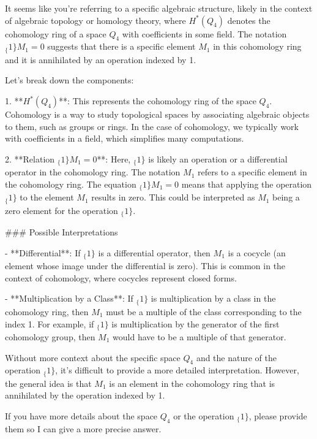 It seems like you're referring to a specific algebraic structure, likely in the context of algebraic topology or homology theory, where \(H^*(Q_4)\) denotes the cohomology ring of a space \(Q_4\) with coefficients in some field. The notation \(_\{1\} M_1 = 0\) suggests that there is a specific element \(M_1\) in this cohomology ring and it is annihilated by an operation indexed by 1.

Let's break down the components:

1. **\(H^*(Q_4)\)**: This represents the cohomology ring of the space \(Q_4\). Cohomology is a way to study topological spaces by associating algebraic objects to them, such as groups or rings. In the case of cohomology, we typically work with coefficients in a field, which simplifies many computations.

2. **Relation \(_\{1\} M_1 = 0\)**: Here, \(_\{1\}\) is likely an operation or a differential operator in the cohomology ring. The notation \(M_1\) refers to a specific element in the cohomology ring. The equation \(_\{1\} M_1 = 0\) means that applying the operation \(_\{1\}\) to the element \(M_1\) results in zero. This could be interpreted as \(M_1\) being a zero element for the operation \(_\{1\}\).

### Possible Interpretations

- **Differential**: If \(_\{1\}\) is a differential operator, then \(M_1\) is a cocycle (an element whose image under the differential is zero). This is common in the context of cohomology, where cocycles represent closed forms.
  
- **Multiplication by a Class**: If \(_\{1\}\) is multiplication by a class in the cohomology ring, then \(M_1\) must be a multiple of the class corresponding to the index 1. For example, if \(_\{1\}\) is multiplication by the generator of the first cohomology group, then \(M_1\) would have to be a multiple of that generator.

Without more context about the specific space \(Q_4\) and the nature of the operation \(_\{1\}\), it's difficult to provide a more detailed interpretation. However, the general idea is that \(M_1\) is an element in the cohomology ring that is annihilated by the operation indexed by 1.

If you have more details about the space \(Q_4\) or the operation \(_\{1\}\), please provide them so I can give a more precise answer.